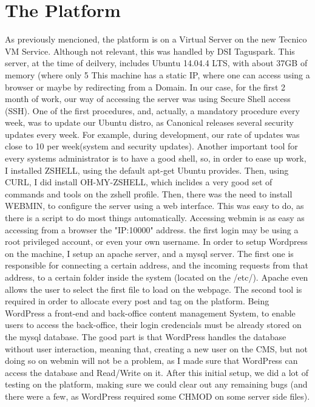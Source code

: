 \documentclass[a4paper,12pt,journal,twoside,compsoc]{PPIEEEtran}
\begin{document}
\section{The Platform}	
As previously mencioned, the platform is on a Virtual Server on the new Tecnico VM Service. Although not relevant, this was handled by DSI Taguspark. This server, at the time of deilvery, includes Ubuntu 14.04.4 LTS, with about 37GB of memory (where only 5%
This machine has a static IP, where one can access using a browser or maybe by redirecting from a Domain. In our case, for the first 2 month of work, our way of accessing the server was using Secure Shell access (SSH). One of the first procedures, and, actually, a mandatory procedure every week, was to update our Ubuntu distro, as Canonical releases several security updates every week. For example, during development, our rate of updates was close to 10 per week(system and security updates).
Another important tool for every systems administrator is to have a good shell, so, in order to ease up work, I installed ZSHELL, using the default apt-get Ubuntu provides. Then, using CURL, I did install OH-MY-ZSHELL, which inclides a very good set of commands and tools on the zshell profile.
Then, there was the need to install WEBMIN, to configure the server using a web interface. This was easy to do, as there is a script to do most things automatically.
Accessing webmin is as easy as accessing from a browser the "IP:10000" address. the first login may be using a root privileged account, or even your own username.
In order to setup Wordpress on the machine, I setup an apache server, and a mysql server. 
The first one is responsible for connecting a certain address, and the incoming requests from that address, to a certain folder inside the system (located on the /etc/). Apache even allows the user to select the first file to load on the webpage.
The second tool is required in order to allocate every post and tag on the platform. Being WordPress a front-end and back-office content management System, to enable users to access the back-office, their login credencials must be already stored on the mysql database. The good part is that WordPress handles the database without user interaction, meaning that, creating a new user on the CMS, but not doing so on webmin will not be a problem, as I made sure that WordPress can access the database and Read/Write on it.
After this initial setup, we did a lot of testing on the platform, making sure we could clear out any remaining bugs (and there were a few, as WordPress required some CHMOD on some server side files).
\end{document}
